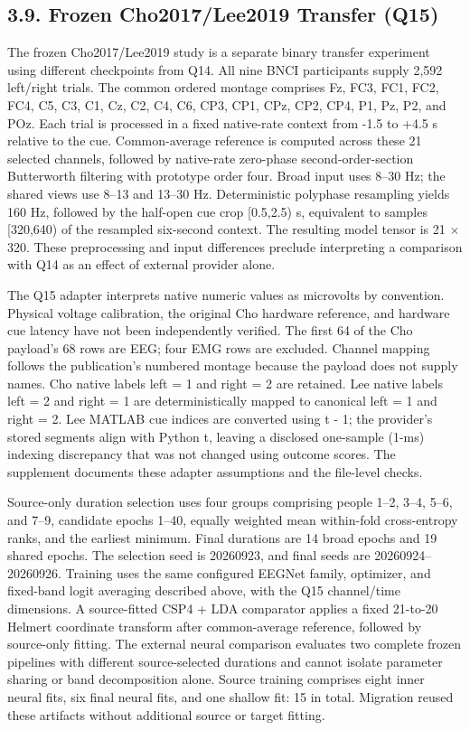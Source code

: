 \documentclass[11pt]{article}
\begin{document}
\subsection*{3.9. Frozen Cho2017/Lee2019 Transfer (Q15)}
The frozen Cho2017/Lee2019 study is a separate binary transfer experiment using different checkpoints from Q14. All nine BNCI participants supply 2,592 left/right trials. The common ordered montage comprises Fz, FC3, FC1, FC2, FC4, C5, C3, C1, Cz, C2, C4, C6, CP3, CP1, CPz, CP2, CP4, P1, Pz, P2, and POz. Each trial is processed in a fixed native-rate context from -1.5 to +4.5 s relative to the cue. Common-average reference is computed across these 21 selected channels, followed by native-rate zero-phase second-order-section Butterworth filtering with prototype order four. Broad input uses 8--30 Hz; the shared views use 8--13 and 13--30 Hz. Deterministic polyphase resampling yields 160 Hz, followed by the half-open cue crop [0.5,2.5) s, equivalent to samples [320,640) of the resampled six-second context. The resulting model tensor is 21 $\times$ 320. These preprocessing and input differences preclude interpreting a comparison with Q14 as an effect of external provider alone.

The Q15 adapter interprets native numeric values as microvolts by convention. Physical voltage calibration, the original Cho hardware reference, and hardware cue latency have not been independently verified. The first 64 of the Cho payload's 68 rows are EEG; four EMG rows are excluded. Channel mapping follows the publication's numbered montage because the payload does not supply names. Cho native labels left = 1 and right = 2 are retained. Lee native labels left = 2 and right = 1 are deterministically mapped to canonical left = 1 and right = 2. Lee MATLAB cue indices are converted using t - 1; the provider's stored segments align with Python t, leaving a disclosed one-sample (1-ms) indexing discrepancy that was not changed using outcome scores. The supplement documents these adapter assumptions and the file-level checks.

Source-only duration selection uses four groups comprising people 1--2, 3--4, 5--6, and 7--9, candidate epochs 1--40, equally weighted mean within-fold cross-entropy ranks, and the earliest minimum. Final durations are 14 broad epochs and 19 shared epochs. The selection seed is 20260923, and final seeds are 20260924--20260926. Training uses the same configured EEGNet family, optimizer, and fixed-band logit averaging described above, with the Q15 channel/time dimensions. A source-fitted CSP4 + LDA comparator applies a fixed 21-to-20 Helmert coordinate transform after common-average reference, followed by source-only fitting. The external neural comparison evaluates two complete frozen pipelines with different source-selected durations and cannot isolate parameter sharing or band decomposition alone. Source training comprises eight inner neural fits, six final neural fits, and one shallow fit: 15 in total. Migration reused these artifacts without additional source or target fitting.
\end{document}
